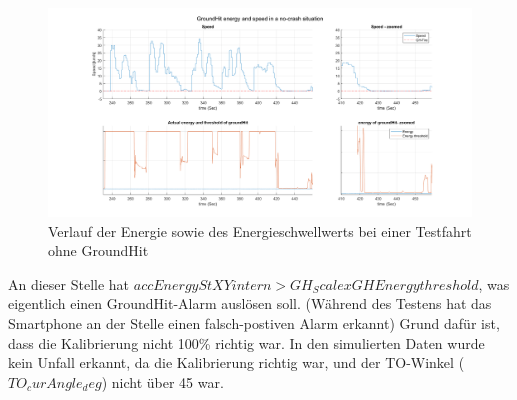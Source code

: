 \begin{figure}[H] %
	\centering
	\includegraphics[width=\linewidth]{Bilder/GH2_speed_GHEnergy.png}
	\caption{Verlauf der Energie sowie des Energieschwellwerts bei einer Testfahrt ohne GroundHit}
	\label{fig:GH_Testfahrt_noGroundHit_EnergyZoomed}
\end{figure}
An dieser Stelle hat $accEnergyStXYintern > GH_ScalexGHEnergythreshold$, was eigentlich einen GroundHit-Alarm auslösen soll. (Während des Testens hat das Smartphone an der Stelle einen falsch-postiven Alarm erkannt) Grund dafür ist, dass die Kalibrierung nicht 100\% richtig war.
In den simulierten Daten wurde kein Unfall erkannt, da die Kalibrierung richtig war, und der TO-Winkel ($TO_curAngle_deg$) nicht über 45 war.

